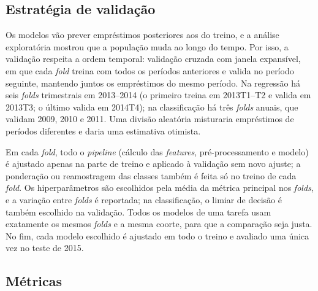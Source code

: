 \subsection{Estratégia de validação}

Os modelos vão prever empréstimos posteriores aos do treino, e a análise exploratória mostrou que a população muda ao longo do tempo. Por isso, a validação respeita a ordem temporal: validação cruzada com janela expansível, em que cada \textit{fold} treina com todos os períodos anteriores e valida no período seguinte, mantendo juntos os empréstimos do mesmo período. Na regressão há seis \textit{folds} trimestrais em 2013--2014 (o primeiro treina em 2013T1--T2 e valida em 2013T3; o último valida em 2014T4); na classificação há três \textit{folds} anuais, que validam 2009, 2010 e 2011. Uma divisão aleatória misturaria empréstimos de períodos diferentes e daria uma estimativa otimista.

Em cada \textit{fold}, todo o \textit{pipeline} (cálculo das \textit{features}, pré-processamento e modelo) é ajustado apenas na parte de treino e aplicado à validação sem novo ajuste; a ponderação ou reamostragem das classes também é feita só no treino de cada \textit{fold}. Os hiperparâmetros são escolhidos pela média da métrica principal nos \textit{folds}, e a variação entre \textit{folds} é reportada; na classificação, o limiar de decisão é também escolhido na validação. Todos os modelos de uma tarefa usam exatamente os mesmos \textit{folds} e a mesma coorte, para que a comparação seja justa. No fim, cada modelo escolhido é ajustado em todo o treino e avaliado uma única vez no teste de 2015.


\subsection{Métricas}

